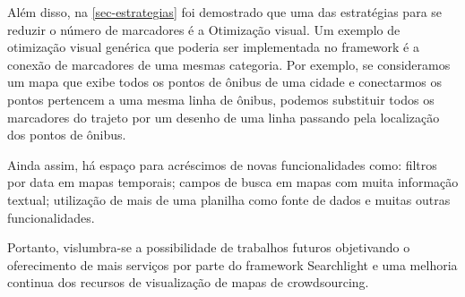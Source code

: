 Além disso, na \autoref{sec-estrategias} foi demostrado que uma das estratégias para se reduzir o número de marcadores é a Otimização visual. Um exemplo de otimização visual genérica que poderia ser implementada no framework é a conexão de marcadores de uma mesmas categoria. Por exemplo, se consideramos um mapa que exibe todos os pontos de ônibus de uma cidade e conectarmos os pontos pertencem a uma mesma linha de ônibus, podemos substituir todos os marcadores do trajeto por um desenho de uma linha passando pela localização dos pontos de ônibus. 

Ainda assim, há espaço para acréscimos de novas funcionalidades  como: filtros por data em mapas temporais; campos de busca em mapas com muita informação textual; utilização de mais de uma planilha como fonte de dados e muitas outras funcionalidades.  

Portanto, vislumbra-se a possibilidade de trabalhos futuros objetivando o oferecimento de mais serviços por parte do framework Searchlight e uma melhoria continua dos recursos de visualização de mapas de crowdsourcing.
